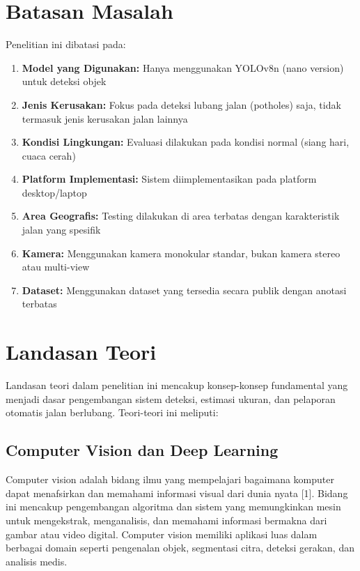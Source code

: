 \documentclass[12pt,a4paper]{report}
\begin{document}
\section{Batasan Masalah}

Penelitian ini dibatasi pada:

\begin{enumerate}
    \item \textbf{Model yang Digunakan:} Hanya menggunakan YOLOv8n (nano version) untuk deteksi objek
    \item \textbf{Jenis Kerusakan:} Fokus pada deteksi lubang jalan (potholes) saja, tidak termasuk jenis kerusakan jalan lainnya
    \item \textbf{Kondisi Lingkungan:} Evaluasi dilakukan pada kondisi normal (siang hari, cuaca cerah)
    \item \textbf{Platform Implementasi:} Sistem diimplementasikan pada platform desktop/laptop
    \item \textbf{Area Geografis:} Testing dilakukan di area terbatas dengan karakteristik jalan yang spesifik
    \item \textbf{Kamera:} Menggunakan kamera monokular standar, bukan kamera stereo atau multi-view
    \item \textbf{Dataset:} Menggunakan dataset yang tersedia secara publik dengan anotasi terbatas
\end{enumerate}

\section{Landasan Teori}

Landasan teori dalam penelitian ini mencakup konsep-konsep fundamental yang menjadi dasar pengembangan sistem deteksi, estimasi ukuran, dan pelaporan otomatis jalan berlubang. Teori-teori ini meliputi:

\subsection{Computer Vision dan Deep Learning}

Computer vision adalah bidang ilmu yang mempelajari bagaimana komputer dapat menafsirkan dan memahami informasi visual dari dunia nyata [1]. Bidang ini mencakup pengembangan algoritma dan sistem yang memungkinkan mesin untuk mengekstrak, menganalisis, dan memahami informasi bermakna dari gambar atau video digital. Computer vision memiliki aplikasi luas dalam berbagai domain seperti pengenalan objek, segmentasi citra, deteksi gerakan, dan analisis medis.
\end{document}
